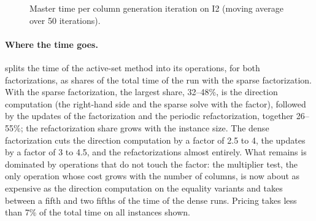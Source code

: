 \begin{figure}[ht]
\centering
{}
\caption{Master time per column generation iteration on I2 (moving average over 50
iterations).}
\label{fig:master-time}
\end{figure}

\paragraph{Where the time goes.}  splits the time of the active-set
method into its operations, for both factorizations, as shares of the total time of the run
with the sparse factorization. With the sparse factorization, the largest share, 32--48\%, is
the direction computation (the right-hand side and the sparse solve with the factor), followed
by the updates of the factorization and the periodic refactorization, together 26--55\%; the
refactorization share grows with the instance size. The dense factorization cuts the
direction computation by a factor of 2.5 to 4, the updates by a factor of 3 to 4.5, and the
refactorizations almost entirely. What remains is dominated by operations that do not touch
the factor: the multiplier test, the only operation whose cost grows with the number of
columns, is now about as expensive as the direction computation on the equality variants and
takes between a fifth and two fifths of the time of the dense runs. Pricing takes less than
7\% of the total time on all instances shown.

